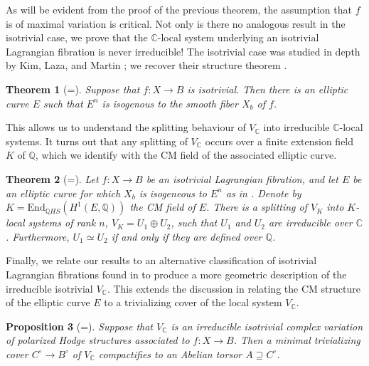 \documentclass[12pt]{amsart}
\newcommand{\Q}{\mathbb{Q}}
\newcommand{\C}{\mathbb{C}}
\newtheorem{theorem}{Theorem}[section]
\newtheorem{proposition}[theorem]{Proposition}
\theoremstyle{definition}
\theoremstyle{remark}
\numberwithin{equation}{section}
\begin{document}
As will be evident from the proof of the previous theorem, the assumption that 
\(f\) is of maximal variation is critical. Not only is there no analogous result
in the isotrivial case, we prove that the \(\C\)-local system underlying 
an isotrivial Lagrangian fibration is never irreducible! 
The isotrivial case was studied in depth by Kim, Laza, and Martin
\cite{kim-laza-martin23}; we recover their structure theorem
\cite[Theorem 1.3]{kim-laza-martin23}.

\begin{theorem}[=] \label{intro-elliptic-curve-theorem}
    Suppose that \(f: X \to B\) is isotrivial. Then there is an elliptic curve \(E\)
    such that \(E^n\) is isogenous to the smooth fiber \(X_b\) of \(f\).
\end{theorem}


This allows us to understand the splitting behaviour of \(V_\C\) into irreducible 
\(\C\)-local systems. It turns out that any splitting of \(V_\C\) occurs
over a finite extension field \(K\) of \(\Q\), which we identify with the CM field
of the associated elliptic curve.

\begin{theorem}[=] 
    Let \(f: X \to B\) be an isotrivial Lagrangian fibration, and let \(E\) be an 
    elliptic curve for which \(X_b\) is isogeneous to \(E^n\) as in .
    Denote by \(K = \mathrm{End}_{\Q HS}(H^1(E, \Q))\) the CM field of \(E\). There is
    a splitting of \(V_K\) into
    \(K\)-local systems of rank \(n\), \(V_K = U_1 \oplus U_2\), such that
    \(U_1\) and \(U_2\) are irreducible over \(\C\). Furthermore, 
    \(U_1 \simeq U_2\) if and only if they are defined over \(\Q\).
\end{theorem}

Finally, we relate our results to an alternative classification of isotrivial 
Lagrangian fibrations found in \cite{kim-laza-martin23} to produce a more geometric
description of the irreducible isotrivial \(V_\C\). This extends the discussion in
\cite[Remark 1.8]{kim-laza-martin23} relating the CM structure of the 
elliptic curve \(E\) to a trivializing cover of the local system \(V_\C\).


\begin{proposition}[=]
    Suppose that \(V_\C\) is an irreducible isotrivial complex variation of
    polarized Hodge structures associated to \(f: X \to B\). Then
    a minimal trivializing cover \(C^\circ \to B^\circ\) of \(V_\C\) 
    compactifies to an Abelian torsor \(A \supseteq C^\circ\).
\end{proposition}
\end{document}
